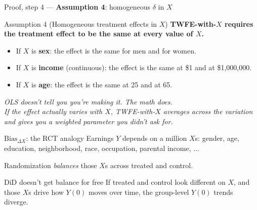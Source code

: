 \documentclass[aspectratio=169,11pt]{beamer}
\begin{document}
\begin{frame}{Proof, step 4 --- \textbf{Assumption 4}: homogeneous $\delta$ in $X$}
\vspace{0.5em}
\begin{block}{Assumption 4 (Homogeneous treatment effects in $X$)}
\centering
\textbf{TWFE-with-$X$ requires the treatment effect to be the same at every value of $X$.}
\end{block}
\vspace{0.6em}
\begin{itemize}
  \item If $X$ is \textbf{sex}: the effect is the same for men and for women.
  \item If $X$ is \textbf{income} (continuous): the effect is the same at \$1 and at \$1{,}000{,}000.
  \item If $X$ is \textbf{age}: the effect is the same at 25 and at 65.
\end{itemize}
\vspace{0.6em}
\begin{center}
\small\color{warmgray}\itshape
{} \;OLS doesn't tell you you're making it. The math does. \\[0.2em]
If the effect actually varies with $X$, TWFE-with-$X$ averages across the variation and gives you a weighted parameter you didn't ask for.
\end{center}
\end{frame}

\begin{frame}{$\text{Bias}_{\Delta X}$: the RCT analogy}
\vspace{0.5em}
Earnings $Y$ depends on a million $X$s: \;gender, age, education, neighborhood, race, occupation, parental income, $\ldots$

\vspace{1.2em}
Randomization \textit{balances} those $X$s across treated and control.

\vspace{0.8em}
\begin{center}
\end{center}
\end{frame}

\begin{frame}{DiD doesn't get balance for free}
\vspace{0.6em}
If treated and control look different on $X$, and those $X$s drive how $Y(0)$ moves over time, the group-level $Y(0)$ trends diverge.

\vspace{1.2em}
\begin{center}
\end{center}
\end{frame}
\end{document}
